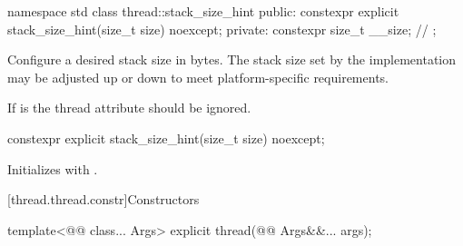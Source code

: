 \documentclass{wg21}
\begin{document}
\begin{addedblock}
\begin{codeblock}
namespace std {
class thread::stack_size_hint {
	public:
		constexpr explicit stack_size_hint(size_t size) noexcept;
	private:
		constexpr size_t __size; // \expos
};
}
\end{codeblock}




Configure a desired stack size in bytes. %
The stack size set by the implementation may be adjusted up or down to meet platform-specific requirements.

If  is  the thread attribute should be ignored.

\begin{itemdecl}
constexpr explicit stack_size_hint(size_t size) noexcept;
\end{itemdecl}

\begin{itemdescr}
\effects Initializes  with .
\end{itemdescr}

\end{addedblock}


[thread.thread.constr]{Constructors}

\begin{itemdecl}
template<@@ class... Args>
explicit thread(@@ Args&&... args);
\end{itemdecl}
\end{document}
